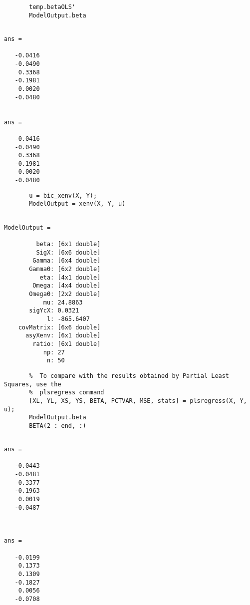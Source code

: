 \documentclass[a4paper,11pt,openany]{memoir}
\begin{document}
\begin{verbatim}       temp.betaOLS'
       ModelOutput.beta\end{verbatim}

 \color{lightgray}\ttfamily \begin{verbatim}

ans =

   -0.0416
   -0.0490
    0.3368
   -0.1981
    0.0020
   -0.0480


ans =

   -0.0416
   -0.0490
    0.3368
   -0.1981
    0.0020
   -0.0480
\end{verbatim} \rmfamily
\color{black}
    
\begin{verbatim}       u = bic_xenv(X, Y);
       ModelOutput = xenv(X, Y, u)\end{verbatim}

\color{lightgray}\ttfamily \begin{verbatim}

ModelOutput = 

         beta: [6x1 double]
         SigX: [6x6 double]
        Gamma: [6x4 double]
       Gamma0: [6x2 double]
          eta: [4x1 double]
        Omega: [4x4 double]
       Omega0: [2x2 double]
           mu: 24.8863
       sigYcX: 0.0321
            l: -865.6407
    covMatrix: [6x6 double]
      asyXenv: [6x1 double]
        ratio: [6x1 double]
           np: 27
            n: 50
\end{verbatim} \rmfamily
\color{black}
    
\begin{verbatim}       %  To compare with the results obtained by Partial Least Squares, use the 
       %  plsregress command
       [XL, YL, XS, YS, BETA, PCTVAR, MSE, stats] = plsregress(X, Y, u);
       ModelOutput.beta
       BETA(2 : end, :)\end{verbatim}
    

        \color{lightgray}\ttfamily \begin{verbatim}

ans =

   -0.0443
   -0.0481
    0.3377
   -0.1963
    0.0019
   -0.0487



ans =

   -0.0199
    0.1373
    0.1309
   -0.1827
    0.0056
   -0.0708

\end{verbatim} \rmfamily
\color{black}
\end{document}
